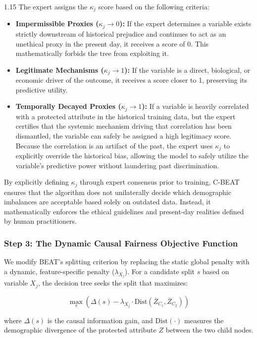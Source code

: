 \documentclass[11pt, a4paper]{article}
\begin{document}
\begin{spacing}{1.15}
The expert assigns the $\kappa_j$ score based on the following criteria:
\begin{itemize}
\item \textbf{Impermissible Proxies ($\kappa_j \to 0$):} If the expert determines a variable exists strictly downstream of historical prejudice and continues to act as an unethical proxy in the present day, it receives a score of 0. This mathematically forbids the tree from exploiting it.
\item \textbf{Legitimate Mechanisms ($\kappa_j \to 1$):} If the variable is a direct, biological, or economic driver of the outcome, it receives a score closer to 1, preserving its predictive utility.
\item \textbf{Temporally Decayed Proxies ($\kappa_j \to 1$):} If a variable is heavily correlated with a protected attribute in the historical training data, but the expert certifies that the systemic mechanism driving that correlation has been dismantled, the variable can safely be assigned a high legitimacy score. Because the correlation is an artifact of the past, the expert uses $\kappa_j$ to explicitly override the historical bias, allowing the model to safely utilize the variable's predictive power without laundering past discrimination.
\end{itemize}
By explicitly defining $ \kappa_j $ through expert consensus prior to training, C-BEAT ensures that the algorithm does not unilaterally decide which demographic imbalances are acceptable based solely on outdated data. Instead, it mathematically enforces the ethical guidelines and present-day realities defined by human practitioners.


\subsubsection*{Step 3: The Dynamic Causal Fairness Objective Function}

We modify BEAT's splitting criterion by replacing the static global penalty with a dynamic, feature-specific penalty ($\lambda_{X_j}$). For a candidate split $s$ based on variable $X_j$, the decision tree seeks the split that maximizes:


$$\max_s \left(\Delta(s) - \lambda_{X_j} \cdot \text{Dist}(\overline{Z}_{C_1},\overline{Z}_{C_2})\right)$$


where $\Delta(s)$ is the causal information gain, and $\text{Dist}(\cdot)$ measures the demographic divergence of the protected attribute $Z$ between the two child nodes.


\end{spacing}
\end{document}

